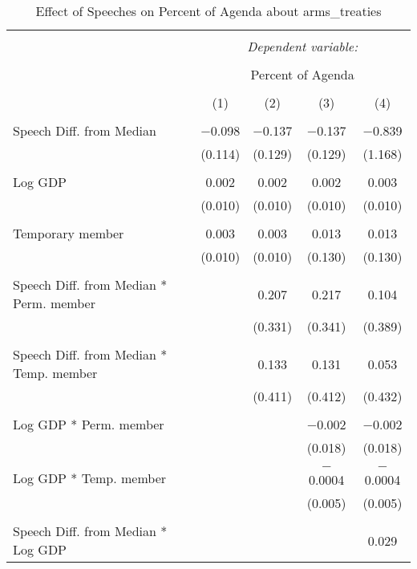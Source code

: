 
\begin{table}[!htbp] \centering 
  \caption{Effect of Speeches on Percent of Agenda about  arms_treaties} 
  \label{} 
\begin{tabular}{@{\extracolsep{5pt}}lcccc} 
\\[-1.8ex]\hline 
\hline \\[-1.8ex] 
 & \multicolumn{4}{c}{\textit{Dependent variable:}} \\ 
\cline{2-5} 
\\[-1.8ex] & \multicolumn{4}{c}{Percent of Agenda} \\ 
\\[-1.8ex] & (1) & (2) & (3) & (4)\\ 
\hline \\[-1.8ex] 
 Speech Diff. from Median & $-$0.098 & $-$0.137 & $-$0.137 & $-$0.839 \\ 
  & (0.114) & (0.129) & (0.129) & (1.168) \\ 
  & & & & \\ 
 Log GDP & 0.002 & 0.002 & 0.002 & 0.003 \\ 
  & (0.010) & (0.010) & (0.010) & (0.010) \\ 
  & & & & \\ 
 Temporary member & 0.003 & 0.003 & 0.013 & 0.013 \\ 
  & (0.010) & (0.010) & (0.130) & (0.130) \\ 
  & & & & \\ 
 Speech Diff. from Median * Perm. member &  & 0.207 & 0.217 & 0.104 \\ 
  &  & (0.331) & (0.341) & (0.389) \\ 
  & & & & \\ 
 Speech Diff. from Median * Temp. member &  & 0.133 & 0.131 & 0.053 \\ 
  &  & (0.411) & (0.412) & (0.432) \\ 
  & & & & \\ 
 Log GDP * Perm. member &  &  & $-$0.002 & $-$0.002 \\ 
  &  &  & (0.018) & (0.018) \\ 
  & & & & \\ 
 Log GDP * Temp. member &  &  & $-$0.0004 & $-$0.0004 \\ 
  &  &  & (0.005) & (0.005) \\ 
  & & & & \\ 
 Speech Diff. from Median * Log GDP &  &  &  & 0.029 \\ 

\end{tabular}
\end{table}
